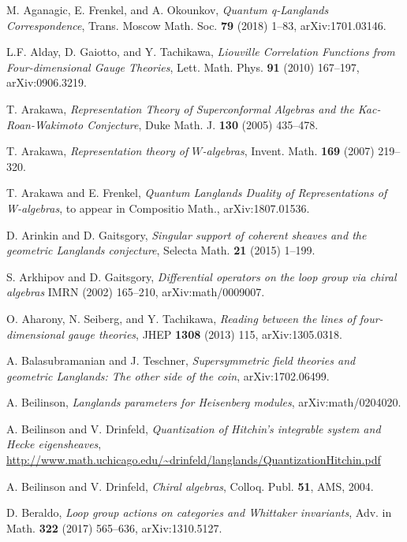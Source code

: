 \documentclass[11pt,reqno]{amsart}
\theoremstyle{plain}
\numberwithin{equation}{section}
\theoremstyle{definition}
\begin{document}
\begin{thebibliography}{AFO}

 M. Aganagic, E. Frenkel, and A. Okounkov, {\em Quantum
    q-Langlands Correspondence}, Trans. Moscow Math. Soc. {\bf 79}
  (2018) 1--83, arXiv:1701.03146.

 L.F. Alday, D. Gaiotto, and Y. Tachikawa, {\em Liouville
    Correlation Functions from Four-dimensional Gauge Theories},
  Lett. Math. Phys. {\bf 91} (2010) 167--197, arXiv:0906.3219.

 T. Arakawa, {\em Representation Theory of
    Superconformal Algebras and the Kac-Roan-Wakimoto Conjecture},
  Duke Math. J. {\bf 130} (2005) 435--478.

 T. Arakawa, {\em Representation theory of
  $W$-algebras}, Invent. Math. {\bf 169} (2007) 219--320.

 T. Arakawa and E. Frenkel, {\em Quantum Langlands Duality
    of Representations of W-algebras}, to appear in Compositio
  Math., arXiv:1807.01536.

 D. Arinkin and D. Gaitsgory, {\em Singular support of
  coherent sheaves and the geometric Langlands conjecture}, Selecta
  Math. {\bf 21} (2015) 1--199.

 S. Arkhipov and D. Gaitsgory, {\em Differential operators on
  the loop group via chiral algebras} IMRN (2002) 165--210,
arXiv:math/0009007.

 O. Aharony, N. Seiberg, and Y. Tachikawa,
  {\em Reading between the lines of four-dimensional gauge theories},
  JHEP {\bf 1308} (2013) 115, arXiv:1305.0318.

 A. Balasubramanian and J. Teschner, {\em Supersymmetric
    field theories and geometric Langlands: The other side of the
    coin}, arXiv:1702.06499.

 A. Beilinson, {\em Langlands parameters for Heisenberg
    modules}, arXiv:math/0204020.

 A. Beilinson and V. Drinfeld, {\em Quantization of
Hitchin's integrable system and Hecke eigensheaves},
\url{http://www.math.uchicago.edu/~drinfeld/langlands/QuantizationHitchin.pdf}

 A. Beilinson and V. Drinfeld, {\em Chiral algebras},
Colloq. Publ. {\bf 51}, AMS, 2004.

 D. Beraldo, {\em Loop group actions on categories and
  Whittaker invariants}, Adv. in Math. {\bf 322} (2017) 565--636,
arXiv:1310.5127.


\end{thebibliography}
\end{document}
